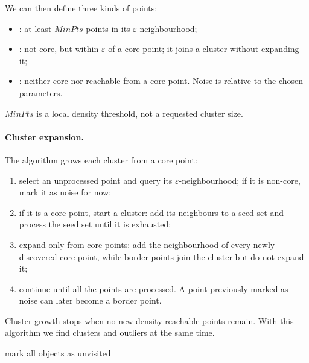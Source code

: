 We can then define three kinds of points:
\begin{itemize}
  \item {}: at least $MinPts$ points in its $\varepsilon$-neighbourhood;
  \item {}: not core, but within $\varepsilon$ of a core point; it joins a cluster without expanding it;
  \item {}: neither core nor reachable from a core point. Noise is relative to the chosen parameters.
\end{itemize}
$MinPts$ is a local density threshold, not a requested cluster size.

\paragraph{Cluster expansion.} The algorithm grows each cluster from a core point:
\begin{enumerate}
  \item select an unprocessed point and query its $\varepsilon$-neighbourhood; if it is non-core, mark it as noise for now;
  \item if it is a core point, start a cluster: add its neighbours to a seed set and process the seed set until it is exhausted;
  \item expand only from core points: add the neighbourhood of every newly discovered core point, while border points join the cluster but do not expand it;
  \item continue until all the points are processed. A point previously marked as noise can later become a border point.
\end{enumerate}
Cluster growth stops when no new density-reachable points remain. With this algorithm we find clusters and outliers at the same time.

\begin{algorithm}[H]
\caption{DBSCAN}
mark all objects as unvisited\;
\end{algorithm}

